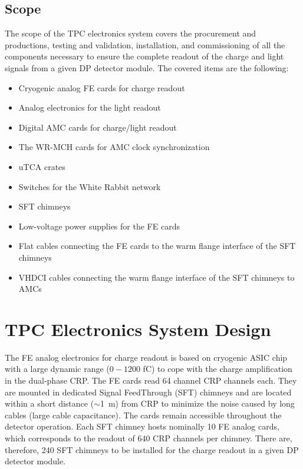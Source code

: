 

\subsection{Scope}
\label{sec:fddp-tpc-elec-scope}

The scope of the TPC electronics system covers the procurement and productions, testing and validation, installation, and commissioning of all the components necessary to ensure the complete readout of the charge and light signals from a given DP detector module. The covered items are the following:
\begin{itemize}
\item{Cryogenic analog FE cards for charge readout}
\item{Analog electronics for the light readout}
\item{Digital AMC cards for charge/light readout}
\item{The WR-MCH cards for AMC clock synchronization}
\item{uTCA crates}
\item{Switches for the White Rabbit network}
\item{SFT chimneys}
\item{Low-voltage power supplies for the FE cards}
\item{Flat cables connecting the FE cards to the warm flange interface of the SFT chimneys}
\item{VHDCI cables connecting the warm flange interface of the SFT chimneys to AMCs}
\end{itemize}



\section{TPC Electronics System Design}
\label{sec:fddp-tpc-elec-design}

The FE analog electronics for charge readout is based on cryogenic ASIC chip with a large dynamic range ($0-1200$ \si{fC}) to cope with the charge amplification in the dual-phase CRP. The FE cards read \num{64} channel CRP channels each. They are mounted in dedicated Signal FeedThrough (SFT) chimneys and are located within a short distance ($\sim$\SI{1}{\metre}) from CRP to minimize the noise caused by long cables (large cable capacitance). The cards remain accessible throughout the detector operation. Each SFT chimney hosts nominally \num{10} FE analog cards, which corresponds to the readout of \num{640} CRP channels per chimney. There are, therefore, \num{240} SFT chimneys to be installed for the charge readout in a given DP detector module.   

